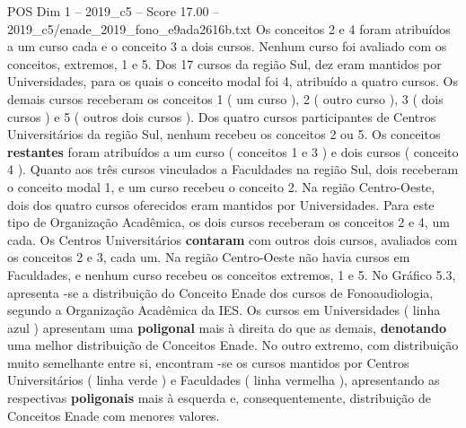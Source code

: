\begin{textsample}{POS Dim 1 – 2019\_c5 – Score 17.00 – 2019\_c5/enade\_2019\_fono\_e9ada2616b.txt}
Os conceitos 2 e 4 foram atribuídos a um curso cada e o conceito 3 a dois cursos.
Nenhum curso foi avaliado com os conceitos, extremos, 1 e 5.
Dos 17 cursos da região Sul, dez eram mantidos por Universidades, para os quais o conceito modal foi 4, atribuído a quatro cursos.
Os demais cursos receberam os conceitos 1 ( um curso ), 2 ( outro curso ), 3 ( dois cursos ) e 5 ( outros dois cursos ).
Dos quatro cursos participantes de Centros Universitários da região Sul, nenhum recebeu os conceitos 2 ou 5.
Os conceitos \textbf{restantes} foram atribuídos a um curso ( conceitos 1 e 3 ) e dois cursos ( conceito 4 ).
Quanto aos três cursos vinculados a Faculdades na região Sul, dois receberam o conceito modal 1, e um curso recebeu o conceito 2.
Na região Centro-Oeste, dois dos quatro cursos oferecidos eram mantidos por Universidades.
Para este tipo de Organização Acadêmica, os dois cursos receberam os conceitos 2 e 4, um cada.
Os Centros Universitários \textbf{contaram} com outros dois cursos, avaliados com os conceitos 2 e 3, cada um.
Na região Centro-Oeste não havia cursos em Faculdades, e nenhum curso recebeu os conceitos extremos, 1 e 5.
No Gráfico 5.3, apresenta -se a distribuição do Conceito Enade dos cursos de Fonoaudiologia, segundo a Organização Acadêmica da IES.
Os cursos em Universidades ( linha azul ) apresentam uma \textbf{poligonal} mais à direita do que as demais, \textbf{denotando} uma melhor distribuição de Conceitos Enade.
No outro extremo, com distribuição muito semelhante entre si, encontram -se os cursos mantidos por Centros Universitários ( linha verde ) e Faculdades ( linha vermelha ), apresentando as respectivas \textbf{poligonais} mais à esquerda e, consequentemente, distribuição de Conceitos Enade com menores valores.

\end{textsample}
